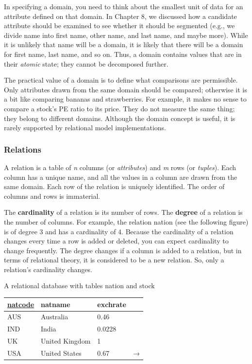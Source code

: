 \documentclass[
]{article}
\begin{document}
In specifying a domain, you need to think about the smallest unit of
data for an attribute defined on that domain. In Chapter 8, we discussed
how a candidate attribute should be examined to see whether it should be
segmented (e.g., we divide name into first name, other name, and last
name, and maybe more). While it is unlikely that name will be a domain,
it is likely that there will be a domain for first name, last name, and
so on. Thus, a domain contains values that are in their \emph{atomic} state;
they cannot be decomposed further.

The practical value of a domain is to define what comparisons are
permissible. Only attributes drawn from the same domain should be
compared; otherwise it is a bit like comparing bananas and strawberries.
For example, it makes no sense to compare a stock's PE ratio to its
price. They do not measure the same thing; they belong to different
domains. Although the domain concept is useful, it is rarely supported
by relational model implementations.

\hypertarget{relations}{%
\subsubsection*{Relations}\label{relations}}

A relation is a table of \emph{n} columns (or \emph{attributes}) and \emph{m} rows (or
\emph{tuples}). Each column has a unique name, and all the values in a column
are drawn from the same domain. Each row of the relation is uniquely
identified. The order of columns and rows is immaterial.

The \textbf{cardinality} of a relation is its number of rows. The \textbf{degree}
of a relation is the number of columns. For example, the relation nation
(see the following figure) is of degree 3 and has a cardinality of 4.
Because the cardinality of a relation changes every time a row is added
or deleted, you can expect cardinality to change frequently. The degree
changes if a column is added to a relation, but in terms of relational
theory, it is considered to be a new relation. So, only a relation's
cardinality changes.

A relational database with tables nation and stock

\begin{longtable}[]{@{}llll@{}}
\toprule
\underline{natcode} & natname & exchrate & \\
\midrule
\endhead
AUS & Australia & 0.46 & \\
IND & India & 0.0228 & \\
UK & United Kingdom & 1 & \\
USA & United States & 0.67 & → \\
\bottomrule
\end{longtable}
\end{document}
